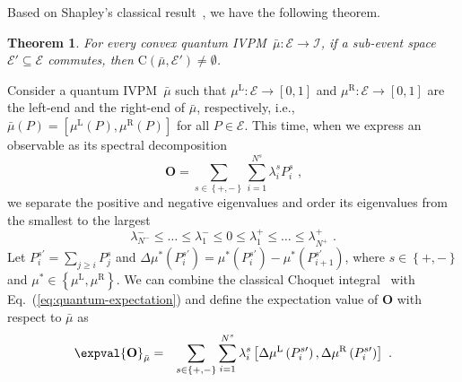 \documentclass[english,reprint, aps, prl,superscriptaddress, showpacs,
showkeys, longbibliography, amsmath, amssymb]{revtex4-1}
\theoremstyle{plain}
\newtheorem{thm}{Theorem}
\theoremstyle{definition}
\newcommand{\events}{\ensuremath{\mathcal{E}}}
\newcommand{\coreBorn}{\ensuremath{\mathrm{C}}}
\newcommand{\mul}[1][]{\ensuremath{\mu^{\mathrm{L{#1}}}}}
\newcommand{\mur}[1][]{\ensuremath{\mu^{\mathrm{R{#1}}}}}
\begin{document}
Based on Shapley's classical result~\cite{Shapley1971,GilboaSchmeidler1994,Grabisch2016},
we have the following theorem.

\begin{thm}\label{thm:Shapley}For every convex quantum IVPM~$\bar{\mu}:\events\rightarrow\mathscr{I}$,
if a sub-event space~$\events'\subseteq\events$ commutes, then $\coreBorn\left(\bar{\mu},\events'\right)\ne\emptyset$.\end{thm}

Consider a quantum IVPM~$\bar{\mu}$ such that $\mul:\events\rightarrow\left[0,1\right]$
and $\mur:\events\rightarrow\left[0,1\right]$ are the left-end and
the right-end of $\bar{\mu}$, respectively, i.e., $\bar{\mu}\left(P\right)=\left[\mul\left(P\right),\mur\left(P\right)\right]$
for all $P\in\events$. This time, when we express an observable as
its spectral decomposition
\begin{equation}
\mathbf{O}=\sum_{s\in\left\{ +,-\right\} }\sum_{i=1}^{N^{s}}\lambda_{i}^{s}P_{i}^{s}\textrm{ ,}\label{eq:spectrum-decomposition}
\end{equation}
we separate the positive and negative eigenvalues and order its eigenvalues
from the smallest to the largest 
\begin{equation}
\lambda_{N^{-}}^{-}\le\ldots\le\lambda_{1}^{-}\le0\le\lambda_{1}^{+}\le\ldots\le\lambda_{N^{+}}^{+}\textrm{ .}
\end{equation}
Let $P_{i}^{s\prime}=\sum_{j\ge i}P_{j}^{s}$ and $\Delta\mu^{*}\left(P_{i}^{s\prime}\right)=\mu^{*}\left(P_{i}^{s\prime}\right)-\mu^{*}\left(P_{i+1}^{s\prime}\right)$,
where $s\in\left\{ +,-\right\} $ and $\mu^{*}\in\left\{ \mul,\mur\right\} $.
We can combine the classical Choquet integral~\cite{Vitali1925,Choquet1954,GilboaSchmeidler1994,Grabisch2016}
with Eq.~(\ref{eq:quantum-expectation}) and define the expectation
value of $\mathbf{O}$ with respect to $\bar{\mu}$ as
\begin{eqnarray}
\expval{\mathbf{O}}_{\bar{\mu}} & = & \sum_{s\in\left\{ +,-\right\} }\sum_{i=1}^{N^{s}}\lambda_{i}^{s}\left[\Delta\mul\left(P_{i}^{s\prime}\right),\Delta\mur\left(P_{i}^{s\prime}\right)\right]\textrm{ .}\label{eq:quantum-interval-expectation}
\end{eqnarray}
\end{document}
